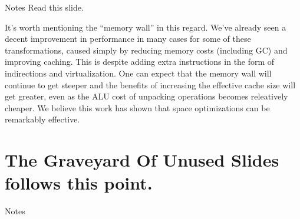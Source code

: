 \documentclass[%
pdf,
colorBG,
slideColor,
nototal,
oqe
]{prosper}
\newenvironment{talknotes}{\begin{slide}{Notes}\tiny}{\end{slide}}
\begin{document}

\begin{talknotes}
Read this slide.

It's worth mentioning the ``memory wall'' in this regard.  We've
already seen a decent improvement in performance in many cases for
some of these transformations, caused simply by reducing memory costs
(including GC) and improving caching.  This is despite adding extra
instructions in the form of indirections and virtualization.  One can
expect that the memory wall will continue to get steeper and the
benefits of increasing the effective cache size will get greater, even
as the ALU cost of unpacking operations becomes releatively cheaper.
We believe this work has shown that space optimizations can be
remarkably effective.
\end{talknotes}

\part{The Graveyard Of Unused Slides follows this point.}

\begin{talknotes}
\end{talknotes}
\end{document}
